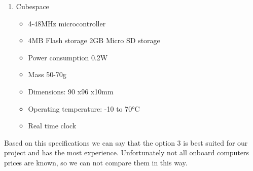 \begin{enumerate}
\begin{itemize}
	\end{itemize}
	\item Cubespace
	\begin{itemize}
		\item 4-48MHz microcontroller
		\item 4MB Flash storage 2GB Micro SD storage
		\item Power consumption 0.2W
		\item Mass 50-70g
		\item Dimensions: 90 x96 x10mm
		\item Operating temperature: -10 to 70°C
		\item Real time clock
	\end{itemize}
\end{enumerate}

Based on this specifications we can say that the option 3 is best suited for our
project and has the most experience. Unfortunately not all onboard
computers prices are known, so we can not compare them in this way.
